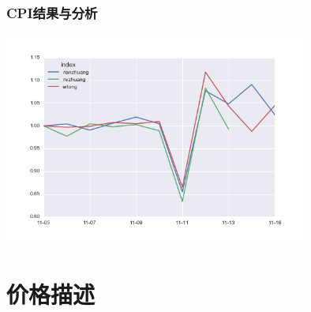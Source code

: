 \documentclass{beamer}
\begin{document}
\subsection{}
\begin{frame}
\frametitle{CPI结果与分析}
\includegraphics[width=10cm,height=7cm]{double11_data_addindex.png}
\end{frame}


\section{价格描述}
\end{document}
